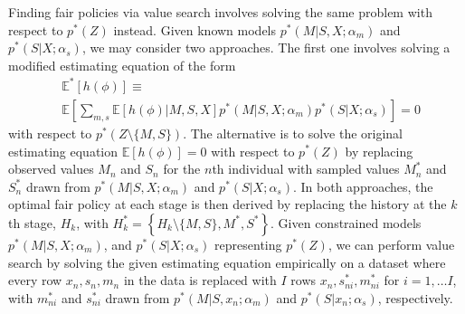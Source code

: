 \documentclass{article}
\newcommand{\E}{\mathbb{E}}
\begin{document}
Finding fair policies via value search involves solving the same problem with respect to $p^*(Z)$ instead. Given known models $p^*(M | S,X; \alpha_m)$ and $p^*(S | X; \alpha_s)$, we may consider two approaches. The first one involves solving a modified estimating equation of the form
{\small
\begin{align*}
&\E^*[ h(\phi) ] \equiv\\
&\E\left[ \sum_{m, s} \E[ h(\phi) | M,S,X ] p^*(M | S,X; \alpha_m) p^*(S | X; \alpha_s) \right] = 0
\end{align*}
}%
with respect to $p^*(Z \setminus \{M, S \})$. 
The alternative is to solve the original estimating equation $\E[ h(\phi) ] = 0$ with respect to $p^*(Z)$ by replacing observed values $M_n$ and $S_n$ for the $n$th individual with sampled values $M^*_n$ and $S^*_n$ drawn from $p^{*}(M|S,X;\alpha_m)$ and $p^{*}(S|X;\alpha_s)$.
In both approaches, the optimal fair policy at each stage is then derived by replacing the history at the $k$th stage, $H_k$, with $H^*_k = \left\{H_k \setminus \{M, S\}, M^*, S^* \right\}$.
Given constrained models $p^*(M | S,X; \alpha_m)$, and $p^*(S | X; \alpha_s)$ representing $p^*(Z)$, we can perform value search by solving the given estimating equation empirically on a dataset where every row $x_n, s_n, m_n$ in the data is replaced with $I$ rows $x_n, s^*_{ni}, m^*_{ni}$ for $i = 1, \ldots I$, 
with $m^*_{ni}$ and $s^*_{ni}$ drawn from $p^*(M | S, x_n; \alpha_m)$ and $p^*(S | x_n; \alpha_s)$, respectively. 
\end{document}
